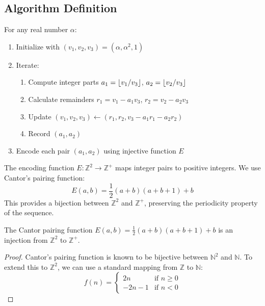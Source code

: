 \begin{theorem}
\subsection{Algorithm Definition}

\begin{algorithm_def}\label{alg:hapd_detailed}
For any real number $\alpha$:
\begin{enumerate}
    \item Initialize with $(v_1, v_2, v_3) = (\alpha, \alpha^2, 1)$
    \item Iterate:
    \begin{enumerate}
        \item Compute integer parts $a_1 = \lfloor v_1/v_3 \rfloor$, $a_2 = \lfloor v_2/v_3 \rfloor$
        \item Calculate remainders $r_1 = v_1 - a_1v_3$, $r_2 = v_2 - a_2v_3$
        \item Update $(v_1, v_2, v_3) \leftarrow (r_1, r_2, v_3 - a_1r_1 - a_2r_2)$
        \item Record $(a_1, a_2)$
    \end{enumerate}
    \item Encode each pair $(a_1, a_2)$ using injective function $E$
\end{enumerate}
\end{algorithm_def}

\begin{definition}
The encoding function $E: \mathbb{Z}^2 \to \mathbb{Z}^+$ maps integer pairs to positive integers. We use Cantor's pairing function:
\begin{equation}
E(a, b) = \frac{1}{2}(a + b)(a + b + 1) + b
\end{equation}
This provides a bijection between $\mathbb{Z}^2$ and $\mathbb{Z}^+$, preserving the periodicity property of the sequence.
\end{definition}

\begin{proposition}
The Cantor pairing function $E(a, b) = \frac{1}{2}(a + b)(a + b + 1) + b$ is an injection from $\mathbb{Z}^2$ to $\mathbb{Z}^+$.
\end{proposition}

\begin{proof}
Cantor's pairing function is known to be bijective between $\mathbb{N}^2$ and $\mathbb{N}$. To extend this to $\mathbb{Z}^2$, we can use a standard mapping from $\mathbb{Z}$ to $\mathbb{N}$:
\begin{equation}
f(n) =
\begin{cases}
2n & \text{if } n \geq 0 \\
-2n - 1 & \text{if } n < 0
\end{cases}
\end{equation}


\end{proof}
\end{theorem}
